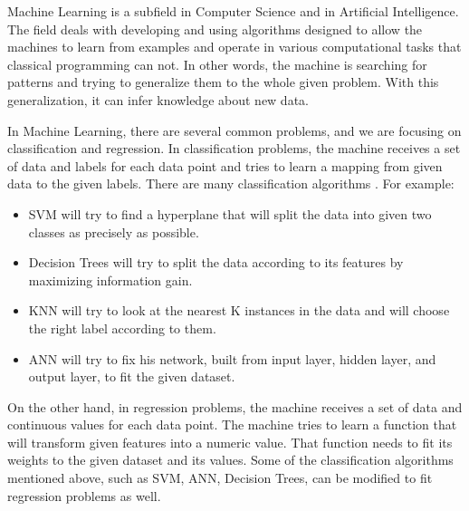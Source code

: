 \documentclass[../main.tex]{subfiles}
\begin{document}
Machine Learning is a subfield in Computer Science and in Artificial Intelligence. 
The field deals with developing and using algorithms designed to allow the machines to 
learn from examples and operate in various computational tasks that classical programming can not. 
In other words, the machine is searching for patterns and trying to generalize them to 
the whole given problem. With this generalization, it can infer knowledge about new data.
\par
 
In Machine Learning, there are several common problems, and we are focusing on classification 
and regression.
In classification problems, the machine receives a set of data and labels for each data point and 
tries to learn a mapping from given data to the given labels. 
There are many classification algorithms \cite{machine_learning_classification_algorithms}. For example:
\begin{itemize}
    \item SVM will try to find a hyperplane that will split the data into given two classes as precisely as possible. 
    \item Decision Trees will try to split the data according to its features by maximizing information gain.
    \item KNN will try to look at the nearest K instances in the data and will choose the right label according to them.
    \item ANN will try to fix his network, built from input layer, hidden layer, and output layer, to fit the given dataset. 
\end{itemize}
On the other hand, in regression problems, the machine receives a set of data and continuous values for 
each data point. The machine tries to learn a function that will transform given features into a 
numeric value. That function needs to fit its weights to the given dataset and its values. 
Some of the classification algorithms mentioned above, such as SVM, ANN, Decision Trees, can be 
modified to fit regression problems as well.
\end{document}
